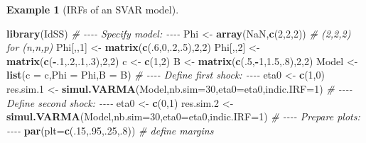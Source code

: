 \documentclass[
  11pt,
]{book}
\newenvironment{Shaded}{\begin{snugshade}}{\end{snugshade}}
\newcommand{\AttributeTok}[1]{\textcolor[rgb]{0.13,0.29,0.53}{#1}}
\newcommand{\CommentTok}[1]{\textcolor[rgb]{0.56,0.35,0.01}{\textit{#1}}}
\newcommand{\ConstantTok}[1]{\textcolor[rgb]{0.56,0.35,0.01}{#1}}
\newcommand{\DecValTok}[1]{\textcolor[rgb]{0.00,0.00,0.81}{#1}}
\newcommand{\FloatTok}[1]{\textcolor[rgb]{0.00,0.00,0.81}{#1}}
\newcommand{\FunctionTok}[1]{\textcolor[rgb]{0.13,0.29,0.53}{\textbf{#1}}}
\newcommand{\NormalTok}[1]{#1}
\newcommand{\OtherTok}[1]{\textcolor[rgb]{0.56,0.35,0.01}{#1}}
\newcommand{\SpecialCharTok}[1]{\textcolor[rgb]{0.81,0.36,0.00}{\textbf{#1}}}
\theoremstyle{definition}
\theoremstyle{definition}
\newtheorem{example}{Example}[chapter]
\theoremstyle{definition}
\theoremstyle{definition}
\theoremstyle{remark}
\begin{document}
\begin{example}[IRFs of an SVAR model]
\begin{Shaded}
\begin{Highlighting}[]
\FunctionTok{library}\NormalTok{(IdSS)}
\CommentTok{\# {-}{-}{-}{-} Specify model: {-}{-}{-}{-}}
\NormalTok{Phi }\OtherTok{\textless{}{-}} \FunctionTok{array}\NormalTok{(}\ConstantTok{NaN}\NormalTok{,}\FunctionTok{c}\NormalTok{(}\DecValTok{2}\NormalTok{,}\DecValTok{2}\NormalTok{,}\DecValTok{2}\NormalTok{)) }\CommentTok{\# (2,2,2) for (n,n,p)}
\NormalTok{Phi[,,}\DecValTok{1}\NormalTok{] }\OtherTok{\textless{}{-}} \FunctionTok{matrix}\NormalTok{(}\FunctionTok{c}\NormalTok{(.}\DecValTok{6}\NormalTok{,}\DecValTok{0}\NormalTok{,.}\DecValTok{2}\NormalTok{,.}\DecValTok{5}\NormalTok{),}\DecValTok{2}\NormalTok{,}\DecValTok{2}\NormalTok{)}
\NormalTok{Phi[,,}\DecValTok{2}\NormalTok{] }\OtherTok{\textless{}{-}} \FunctionTok{matrix}\NormalTok{(}\FunctionTok{c}\NormalTok{(}\SpecialCharTok{{-}}\NormalTok{.}\DecValTok{1}\NormalTok{,.}\DecValTok{2}\NormalTok{,.}\DecValTok{1}\NormalTok{,.}\DecValTok{3}\NormalTok{),}\DecValTok{2}\NormalTok{,}\DecValTok{2}\NormalTok{)}
\NormalTok{c }\OtherTok{\textless{}{-}} \FunctionTok{c}\NormalTok{(}\DecValTok{1}\NormalTok{,}\DecValTok{2}\NormalTok{)}
\NormalTok{B }\OtherTok{\textless{}{-}} \FunctionTok{matrix}\NormalTok{(}\FunctionTok{c}\NormalTok{(.}\DecValTok{5}\NormalTok{,}\SpecialCharTok{{-}}\DecValTok{1}\NormalTok{,}\FloatTok{1.5}\NormalTok{,.}\DecValTok{8}\NormalTok{),}\DecValTok{2}\NormalTok{,}\DecValTok{2}\NormalTok{)}
\NormalTok{Model }\OtherTok{\textless{}{-}} \FunctionTok{list}\NormalTok{(}\AttributeTok{c =}\NormalTok{ c,}\AttributeTok{Phi =}\NormalTok{ Phi,}\AttributeTok{B =}\NormalTok{ B)}
\CommentTok{\# {-}{-}{-}{-} Define first shock: {-}{-}{-}{-}}
\NormalTok{eta0 }\OtherTok{\textless{}{-}} \FunctionTok{c}\NormalTok{(}\DecValTok{1}\NormalTok{,}\DecValTok{0}\NormalTok{)}
\NormalTok{res.sim}\FloatTok{.1} \OtherTok{\textless{}{-}} \FunctionTok{simul.VARMA}\NormalTok{(Model,}\AttributeTok{nb.sim=}\DecValTok{30}\NormalTok{,}\AttributeTok{eta0=}\NormalTok{eta0,}\AttributeTok{indic.IRF=}\DecValTok{1}\NormalTok{)}
\CommentTok{\# {-}{-}{-}{-} Define second shock: {-}{-}{-}{-}}
\NormalTok{eta0 }\OtherTok{\textless{}{-}} \FunctionTok{c}\NormalTok{(}\DecValTok{0}\NormalTok{,}\DecValTok{1}\NormalTok{)}
\NormalTok{res.sim}\FloatTok{.2} \OtherTok{\textless{}{-}} \FunctionTok{simul.VARMA}\NormalTok{(Model,}\AttributeTok{nb.sim=}\DecValTok{30}\NormalTok{,}\AttributeTok{eta0=}\NormalTok{eta0,}\AttributeTok{indic.IRF=}\DecValTok{1}\NormalTok{)}
\CommentTok{\# {-}{-}{-}{-} Prepare plots: {-}{-}{-}{-}}
\FunctionTok{par}\NormalTok{(}\AttributeTok{plt=}\FunctionTok{c}\NormalTok{(.}\DecValTok{15}\NormalTok{,.}\DecValTok{95}\NormalTok{,.}\DecValTok{25}\NormalTok{,.}\DecValTok{8}\NormalTok{)) }\CommentTok{\# define margins}

\end{Highlighting}
\end{Shaded}
\end{example}
\end{document}
